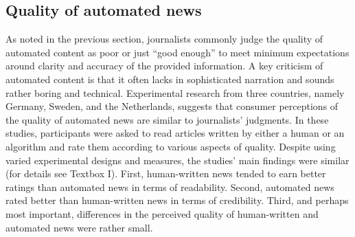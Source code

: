 \documentclass[notoc, symmetric, nobib, nols]{towcenter-guideto-book}
\begin{document}
\subsection{Quality of automated news}

As noted in the previous section, journalists commonly judge the quality of automated content as poor or just ``good enough'' to meet minimum expectations around clarity and accuracy of the provided information. A key criticism of automated content is that it often lacks in sophisticated narration and sounds rather boring and technical. Experimental research from three countries, namely Germany, Sweden, and the Netherlands, suggests that consumer perceptions of the quality of automated news are similar to journalists' judgments. In these studies, participants were asked to read articles written by either a human or an algorithm and rate them according to various aspects of quality.\autocites{clerwall15, kaa14, graefe15} Despite using varied experimental designs and measures, the studies' main findings were similar (for details see Textbox I). First, human-written news tended to earn better ratings than automated news in terms of readability. Second, automated news rated better than human-written news in terms of credibility. Third, and perhaps most important, differences in the perceived quality of human-written and automated news were rather small.
\end{document}
